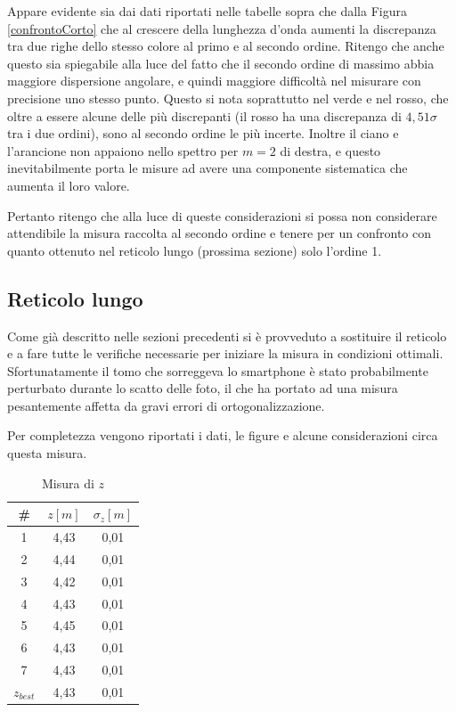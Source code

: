\documentclass{article}
\begin{document}
Appare evidente sia dai dati riportati nelle tabelle sopra che dalla Figura \ref{confrontoCorto} che al crescere della lunghezza d'onda aumenti la discrepanza tra due righe dello stesso colore al primo e al secondo ordine. Ritengo che anche questo sia spiegabile alla luce del fatto che il secondo ordine di massimo abbia maggiore dispersione angolare, e quindi maggiore difficoltà nel misurare con precisione uno stesso punto. Questo si nota soprattutto nel verde e nel rosso, che oltre a essere alcune delle più discrepanti (il rosso ha una discrepanza di $4,51\sigma$ tra i due ordini), sono al secondo ordine le più incerte. Inoltre il ciano e l'arancione non appaiono nello spettro per $m=2$ di destra, e questo inevitabilmente porta le misure ad avere una componente sistematica che aumenta il loro valore.

\vspace{3mm}

Pertanto ritengo che alla luce di queste considerazioni si possa non considerare attendibile la misura raccolta al secondo ordine e tenere per un confronto con quanto ottenuto nel reticolo lungo (prossima sezione) solo l'ordine 1.

\pagebreak
\subsection{Reticolo lungo}

Come già descritto nelle sezioni precedenti si è provveduto a sostituire il reticolo e a fare tutte le verifiche necessarie per iniziare la misura in condizioni ottimali. Sfortunatamente il tomo che sorreggeva lo smartphone è stato probabilmente perturbato durante lo scatto delle foto, il che ha portato ad una misura pesantemente affetta da gravi errori di ortogonalizzazione. 

\vspace{3mm}

Per completezza vengono riportati i dati, le figure e alcune considerazioni circa questa misura.

\begin{table}[h]
    \centering
        \begin{tabular}{||c|c|c||}
            \hline
            \# & $z [m]$ & $\sigma_z [m]$\\
            \hline
            1 & 4,43 & 0,01 \\
            2 & 4,44 & 0,01 \\
            3 & 4,42 & 0,01 \\
            4 & 4,43 & 0,01 \\
            5 & 4,45 & 0,01 \\
            6 & 4,43 & 0,01 \\
            7 & 4,43 & 0,01 \\
            \hline
            $z_{best}$ & 4,43 & 0,01 \\
            \hline
        \end{tabular}
    \caption{Misura di $z$}
\end{table}
\end{document}
